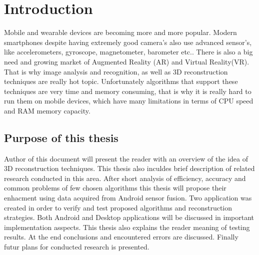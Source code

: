 
\chapter{Introduction}
\ifpdf
    \graphicspath{{1_introduction/figures/PNG/}{1_introduction/figures/PDF/}{1_introduction/figures/}}
\else
    \graphicspath{{1_introduction/figures/EPS/}{1_introduction/figures/}}
\fi


Mobile and wearable devices are becoming more and more popular. Modern smartphones despite having extremely good camera's also use advanced sensor's, like accelerometers, gyroscope, magnetometer, barometer etc.. There is also a big need and growing market of Augmented Reality (AR) and Virtual Reality(VR). That is why image analysis and recognition, as well as 3D reconstruction techniques are really hot topic. Unfortunately algorithms that support these techniques are very time and memory consuming, that is why it is really hard to run them on mobile devices, which have many limitations in terms of CPU speed and RAM memory capacity.

\section{Purpose of this thesis} %
Author of this document will present the reader with an overview of the idea of 3D reconstruction techniques. This thesis also inculdes brief description of related research conducted in this area. After short analysis of efficiency, accuracy and common problems of few chosen algorithms this thesis will propose their enhacment using data acquired from Android sensor fusion. Two application was created in order to verify and test proposed algorithms and reconstruction strategies. Both Android and Desktop applications will be discussed in important implementation asspects. This thesis also explains the reader meaning of testing results. At the end conclusions and encountered errors are discussed. Finally futur plans for conducted research is presented.
